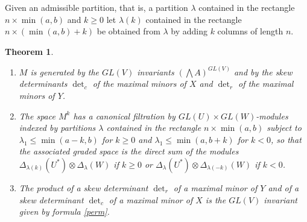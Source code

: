 \documentclass[10pt]{amsart}
\newtheorem{theorem}{Theorem}[section]
\theoremstyle{definition}
\theoremstyle{remark}
\begin{document}
 Given an admissible partition, that is, a partition $\lambda$ contained in the rectangle $n\times \min(a,b)$ and $k\geq 0$ let $\lambda(k)$ contained in the rectangle $n\times(\min(a,b)+k)$ be obtained from $\lambda$ by adding $k$  columns of length $n$.
 \begin{theorem}\label{fonn}\strut 
 \begin{enumerate}\item $M$ is generated by the $GL(V)$ invariants $(\bigwedge A)^{GL(V)}$ and by the skew determinants $\det_c$ of the maximal minors of $X$ and $\det_r$ of the maximal minors of   $Y$.
\item The space   $M^k$ has a canonical  filtration by $GL(U)\times GL(W)$-modules indexed by  partitions $\lambda$ contained in the rectangle $n\times \min(a,b)$ subject to $\lambda_1\leq\min(a-k,b)$ for $k\geq0$ and $\lambda_1\leq\min(a,b+k)$ for $k<0$, so that the associated graded space is the direct sum of the modules $\Delta_{\lambda(k)}(U^*)\otimes \Delta_{\lambda}(W)$  if  $k\geq 0$  or $\Delta_{\lambda}(U^*)\otimes \Delta_{\lambda(-k)}(W)$  if  $k< 0$. 
\item  The product of a skew determinant  $\det_r$ of a  maximal minor of $Y$ and of a skew determinant  $\det_c$ of a  maximal minor of $X$  is the $GL(V)$  invariant given by formula  \eqref{perm}.
 \end{enumerate}

\end{theorem}
\end{document}
